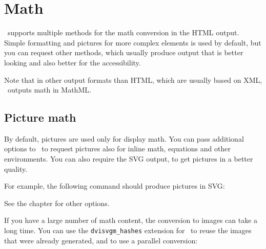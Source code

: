 \documentclass{book}
\begin{document}
\begin{texsource}
\end{texsource}


\section{Math}
\label{sec:howto-math}

\texfourht\ supports multiple methods for the math conversion in the
HTML output. Simple formatting and pictures for more complex elements
is used by default, but you can request other methods, which usually 
produce output that is better looking and also better for the accessibility.

Note that in other output formats than HTML, which are usually based on XML,
\texfourht\ outputs math in MathML.

\subsection{Picture math}
\label{sec:howto-picm}

By default, pictures are used only for display math. You can pass additional 
options to \texfourht\ to request pictures also for inline math, equations
and other environments. You can also require the SVG output, to get pictures
in a better quality.

For example, the following command should produce pictures in SVG:


See the  chapter for other  options. 

If you have a large number of math content, the conversion to images can take
a long time. You can use the \verb|dvisvgm_hashes| extension for \makefourht\ 
to reuse the images that were already generated, and to use a parallel conversion:
\end{document}
